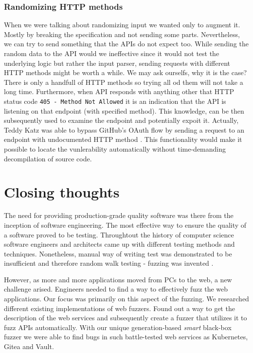\subsubsection{Randomizing HTTP methods}
When we were talking about randomizing input we wanted only to augment it. Mostly by breaking the specification and not sending some parts. Nevertheless, we can try to send something that the APIs do not expect too. While sending the random data to the API would we ineffective since it would not test the underlying logic but rather the input parser, sending requests with different HTTP methods might be worth a while. We may ask ourselfs, why it is the case? There is only a handfull of HTTP methods so trying all od them will not take a long time. Furthermore, when API responds with anything other that HTTP status code \texttt{405 - Method Not Allowed} it is an indication that the API is listening on that endpoint (with specified method). This knowledge, can be then subsequently used to examine the endpoint and potentially expoit it. Actually, Teddy Katz was able to bypass GitHub's OAuth flow by sending a request to an endpoint with undocumented HTTP method \cite{kartz2019bypass}. This functionality would make it possible to locate the vunlerability automatically without time-demanding decompilation of source code.


\section{Closing thoughts}
The need for providing production-grade quality software was there from the inception of software engineering. The most effective way to ensure the quality of a software proved to be testing. Throughtout the history of computer science software engineers and architects came up with different testing methods and techniques. Nonetheless, manual way of writing test was demonstrated to be insufficient and therefore random walk testing - fuzzing was invented \cite{miller1990empirical}.

However, as more and more applications moved from PCs to the web, a new challenge arised. Engineers needed to find a way to effectively fuzz the web applications. Our focus was primarily on this aspect of the fuzzing. We researched different existing implementations of web fuzzers. Found out a way to get the description of the web services and subsequently create a fuzzer that utilizes it to fuzz APIs automatically. With our unique generation-based \textit{smart} black-box fuzzer we were able to find bugs in such battle-tested web services as Kubernetes, Gitea and Vault.

